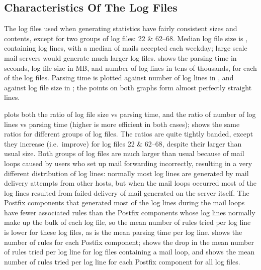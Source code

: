 \subsection{Characteristics Of The \numberOFlogFILES{} Log Files}

\label{Characteristics of the 93 log files}

The \numberOFlogFILES{} log files used when generating statistics have
fairly consistent sizes and contents, except for two groups of log files:
22 \& 62--68.  Median log file size is
, containing
 log lines, with a median
of  mails accepted
each weekday; large scale mail servers would generate much larger log
files.   shows the parsing time in seconds, log file size in MB, and number
of log lines in tens of thousands, for each of the \numberOFlogFILES{} log
files.  Parsing time is plotted against number of log lines in
, and against
log file size in ;
the points on both graphs form almost perfectly straight lines.

 plots both the ratio of log file size vs parsing time, and the
ratio of number of log lines vs parsing time (higher is more efficient in
both cases);  shows the same ratios for different groups of log files.  The
ratios are quite tightly banded, except they increase (i.e.\ improve) for
log files 22 \& 62--68, despite their larger than usual size.  Both groups
of log files are much larger than usual because of mail loops caused by
users who set up mail forwarding incorrectly, resulting in a very different
distribution of log lines: normally most log lines are generated by mail
delivery attempts from other hosts, but when the mail loops occurred most
of the log lines resulted from failed delivery of mail generated on the
server itself.  The Postfix components that generated most of the log lines
during the mail loops have fewer associated rules than the Postfix
components whose log lines normally make up the bulk of each log file, so
the mean number of rules tried per log line is lower for these log files,
as is the mean parsing time per log line.   shows the number of rules for each Postfix component;
 shows the drop in the
mean number of rules tried per log line for log files containing a mail
loop, and  shows the mean number of rules tried per log line for each
Postfix component for all log files.

